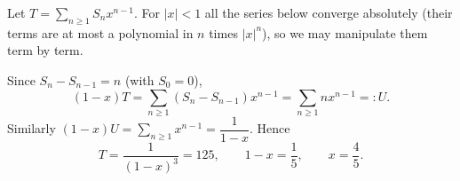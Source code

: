 Let $T=\displaystyle\sum_{n\ge1}S_nx^{n-1}$. For $|x|<1$ all the series below converge absolutely (their terms are at most a polynomial in $n$ times $|x|^n$), so we may manipulate them term by term.

Since $S_n-S_{n-1}=n$ (with $S_0=0$),
\[(1-x)T=\sum_{n\ge1}\left(S_n-S_{n-1}\right)x^{n-1}=\sum_{n\ge1}nx^{n-1}=:U.\]
Similarly $(1-x)U=\displaystyle\sum_{n\ge1}x^{n-1}=\dfrac1{1-x}$. Hence
\[T=\dfrac{1}{(1-x)^3}=125,\qquad 1-x=\dfrac15,\qquad x=\boxed{\dfrac45}.\]
